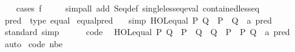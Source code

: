 \begin{isabellebody}
%
\isadelimproof
\ \ %
\endisadelimproof
%
\isatagproof
{}\isamarkupfalse%
\ {\isacharparenleft}{\kern0pt}cases\ {\isachardoublequoteopen}f\ {\isacharparenleft}{\kern0pt}{\isacharparenright}{\kern0pt}{\isachardoublequoteclose}{\isacharparenright}{\kern0pt}\isanewline
\ \ \ \ {\isacharparenleft}{\kern0pt}simp{\isacharunderscore}{\kern0pt}all\ add{\isacharcolon}{\kern0pt}\ Seq{\isacharunderscore}{\kern0pt}def\ single{\isacharunderscore}{\kern0pt}less{\isacharunderscore}{\kern0pt}eq{\isacharunderscore}{\kern0pt}eval\ contained{\isacharunderscore}{\kern0pt}less{\isacharunderscore}{\kern0pt}eq{\isacharparenright}{\kern0pt}%
\endisatagproof
{\isafoldproof}%
%
\isadelimproof
\isanewline
%
\endisadelimproof
\isanewline
{}\isamarkupfalse%
\ pred\ {\isacharcolon}{\kern0pt}{\isacharcolon}{\kern0pt}\ {\isacharparenleft}{\kern0pt}type{\isacharparenright}{\kern0pt}\ equal\isanewline
{}\isanewline
\isanewline
{}\isamarkupfalse%
\ equal{\isacharunderscore}{\kern0pt}pred\isanewline
\ \ \ {\isacharbrackleft}{\kern0pt}simp{\isacharbrackright}{\kern0pt}{\isacharcolon}{\kern0pt}\ {\isachardoublequoteopen}HOL{\isachardot}{\kern0pt}equal\ P\ Q\ {\isasymlongleftrightarrow}\ P\ {\isacharequal}{\kern0pt}\ {\isacharparenleft}{\kern0pt}Q\ {\isacharcolon}{\kern0pt}{\isacharcolon}{\kern0pt}\ {\isacharprime}{\kern0pt}a\ pred{\isacharparenright}{\kern0pt}{\isachardoublequoteclose}\isanewline
\isanewline
{}\isamarkupfalse%
%
\isadelimproof
\ %
\endisadelimproof
%
\isatagproof
{}\isamarkupfalse%
\ standard\ simp%
\endisatagproof
{\isafoldproof}%
%
\isadelimproof
%
\endisadelimproof
\isanewline
\isanewline
{}\isamarkupfalse%
\isanewline
\ \ \ \ \isanewline
{}\isamarkupfalse%
\ {\isacharbrackleft}{\kern0pt}code{\isacharbrackright}{\kern0pt}{\isacharcolon}{\kern0pt}\isanewline
\ \ {\isachardoublequoteopen}HOL{\isachardot}{\kern0pt}equal\ P\ Q\ {\isasymlongleftrightarrow}\ P\ {\isasymle}\ Q\ {\isasymand}\ Q\ {\isasymle}\ P{\isachardoublequoteclose}\ \ P\ Q\ {\isacharcolon}{\kern0pt}{\isacharcolon}{\kern0pt}\ {\isachardoublequoteopen}{\isacharprime}{\kern0pt}a\ pred{\isachardoublequoteclose}\isanewline
%
\isadelimproof
\ \ %
\endisadelimproof
%
\isatagproof
{}\isamarkupfalse%
\ auto%
\endisatagproof
{\isafoldproof}%
%
\isadelimproof
\isanewline
%
\endisadelimproof
\isanewline
{}\isamarkupfalse%
\ {\isacharbrackleft}{\kern0pt}code\ nbe{\isacharbrackright}{\kern0pt}{\isacharcolon}{\kern0pt}\isanewline

\end{isabellebody}
